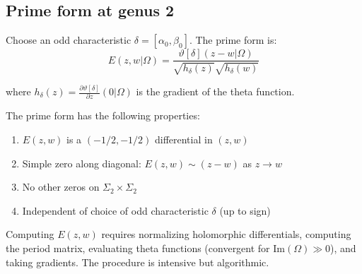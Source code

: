 \subsection{Prime form at genus 2}

\begin{definition}[Prime form \texorpdfstring{$E(z,w)$}{E(z,w)} for \texorpdfstring{$g=2$}{g=2}; \ClaimStatusDefinitional]
\label{def:prime-form-g2}
Choose an odd characteristic $\delta = [\alpha_0, \beta_0]$. The prime form is:
\begin{equation}
E(z,w|\Omega) = \frac{\vartheta[\delta](z-w|\Omega)}{\sqrt{h_\delta(z)} \sqrt{h_\delta(w)}}
\end{equation}

where $h_\delta(z) = \frac{\partial \vartheta[\delta]}{\partial z}(0|\Omega)$ is the gradient of the theta function.

The prime form has the following properties:
\begin{enumerate}
\item $E(z,w)$ is a $(-1/2, -1/2)$ differential in $(z,w)$
\item Simple zero along diagonal: $E(z,w) \sim (z-w)$ as $z \to w$
\item No other zeros on $\Sigma_2 \times \Sigma_2$
\item Independent of choice of odd characteristic $\delta$ (up to sign)
\end{enumerate}
\end{definition}

\begin{remark}
\label{rem:prime-form-computation}
Computing $E(z,w)$ requires normalizing holomorphic differentials, computing the period matrix, evaluating theta functions (convergent for $\text{Im}(\Omega) \gg 0$), and taking gradients. The procedure is intensive but algorithmic.
\end{remark}

